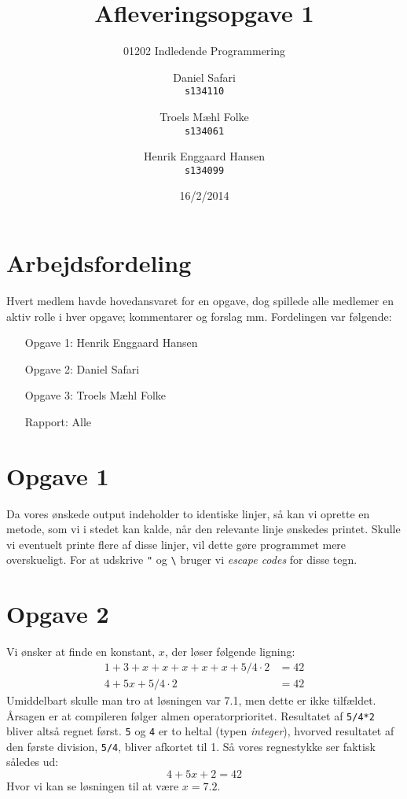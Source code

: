 \documentclass{scrartcl}
\newcommand\code[1]{\texttt{#1}}
\begin{document}

\title{Afleveringsopgave 1}
\subtitle{01202 Indledende Programmering}
\author{
  Daniel Safari\\
  \texttt{s134110}
  \and
  Troels Mæhl Folke\\
  \texttt{s134061}
   \and
  Henrik Enggaard Hansen\\
  \texttt{s134099}
}
\date{16/2/2014}
\maketitle
\thispagestyle{empty}
\setcounter{page}{0}
\null
\vfill
\section*{Arbejdsfordeling}
Hvert medlem havde hovedansvaret for en opgave, dog spillede alle medlemer en aktiv rolle i hver opgave; kommentarer og forslag mm. Fordelingen var følgende:
\begin{itemize}
\setlength{\itemindent}{3em}
\item[Opgave 1:] Henrik Enggaard Hansen
\item[Opgave 2:] Daniel Safari
\item[Opgave 3:] Troels Mæhl Folke
\item[Rapport:]  Alle
\end{itemize}
\newpage
\section*{Opgave 1}
Da vores ønskede output indeholder to identiske linjer, så kan vi oprette en metode, som vi i stedet kan kalde, når den relevante linje ønskedes printet. Skulle vi eventuelt printe flere af disse linjer, vil dette gøre programmet mere overskueligt. For at udskrive \code{"} og \code{\textbackslash} bruger vi \emph{escape codes} for disse tegn.

\section*{Opgave 2}
Vi ønsker at finde en konstant, $x$, der løser følgende ligning: 
\begin{align*}
1+3+x+x+x+x+x+5/4 \cdot 2 & = 42 \\
         4+5x+5/4 \cdot 2 & = 42
\end{align*}
Umiddelbart skulle man tro at løsningen var 7.1, men dette er ikke tilfældet. Årsagen er at compileren følger almen operatorprioritet. Resultatet af \code{5/4*2} bliver altså regnet først. \code{5} og \code{4} er to heltal (typen \emph{integer}), hvorved resultatet af den første division, \code{5/4}, bliver afkortet til 1. Så vores regnestykke ser faktisk således ud:
$$ 4+5x+2 = 42 $$
Hvor vi kan se løsningen til at være $x=7.2$.
\end{document}
